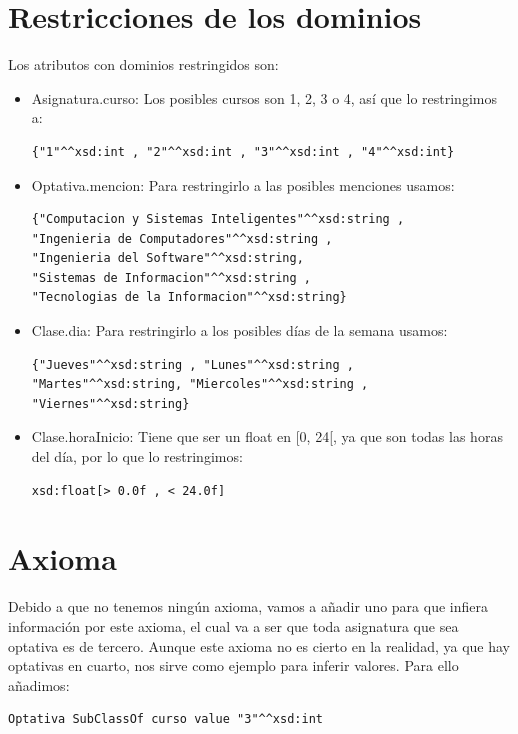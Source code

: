 \documentclass[11pt,a4paper]{article}
\begin{document}
\section*{Restricciones de los dominios}

Los atributos con dominios restringidos son:
\begin{itemize}
\item Asignatura.curso: Los posibles cursos son 1, 2, 3 o 4, así que lo restringimos a:
\begin{lstlisting}[basicstyle=\scriptsize]
{"1"^^xsd:int , "2"^^xsd:int , "3"^^xsd:int , "4"^^xsd:int}
\end{lstlisting}
\item Optativa.mencion: Para restringirlo a las posibles menciones usamos:
\begin{lstlisting}[basicstyle=\scriptsize]
{"Computacion y Sistemas Inteligentes"^^xsd:string ,
"Ingenieria de Computadores"^^xsd:string ,
"Ingenieria del Software"^^xsd:string,
"Sistemas de Informacion"^^xsd:string ,
"Tecnologias de la Informacion"^^xsd:string}
\end{lstlisting}
\item Clase.dia: Para restringirlo a los posibles días de la semana usamos:
\begin{lstlisting}[basicstyle=\scriptsize]
{"Jueves"^^xsd:string , "Lunes"^^xsd:string ,
"Martes"^^xsd:string, "Miercoles"^^xsd:string ,
"Viernes"^^xsd:string}
\end{lstlisting}
\item Clase.horaInicio: Tiene que ser un float en [0, 24[, ya que son todas las horas del día, por lo que lo restringimos:
\begin{lstlisting}[basicstyle=\scriptsize]
xsd:float[> 0.0f , < 24.0f]
\end{lstlisting}
\end{itemize}

\section*{Axioma}

Debido a que no tenemos ningún axioma, vamos a añadir uno para que infiera información por este axioma, el cual va a ser que toda asignatura que sea optativa es de tercero. Aunque este axioma no es cierto en la realidad, ya que hay optativas en cuarto, nos sirve como ejemplo para inferir valores. Para ello añadimos:
\begin{lstlisting}[basicstyle=\scriptsize]
Optativa SubClassOf curso value "3"^^xsd:int
\end{lstlisting}
\end{document}
